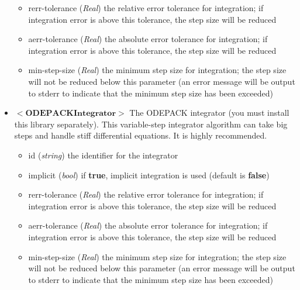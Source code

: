 \documentclass{article}
\begin{document}
\begin{landscape}
\begin{itemize}
\begin{itemize}
\item rerr-tolerance (\emph{Real}) the relative error tolerance for integration; if integration error is above this tolerance, the step size will be reduced
\item aerr-tolerance (\emph{Real}) the absolute error tolerance for integration; if integration error is above this tolerance, the step size will be reduced
\item min-step-size (\emph{Real}) the minimum step size for integration; the step size will not be reduced below this parameter (an error message will be output to stderr to indicate that the minimum step size has been exceeded)
\end{itemize} 
\item $<\textbf{ODEPACKIntegrator}>$ The ODEPACK integrator (you must install this library separately). This variable-step integrator algorithm can take big steps and handle stiff differential equations. It is highly recommended.
\begin{itemize}
\item id  (\emph{string}) the identifier for the integrator
\item implicit (\emph{bool}) if \textbf{true}, implicit integration is used (default is \textbf{false})
\item rerr-tolerance (\emph{Real}) the relative error tolerance for integration; if integration error is above this tolerance, the step size will be reduced
\item aerr-tolerance (\emph{Real}) the absolute error tolerance for integration; if integration error is above this tolerance, the step size will be reduced
\item min-step-size (\emph{Real}) the minimum step size for integration; the step size will not be reduced below this parameter (an error message will be output to stderr to indicate that the minimum step size has been exceeded)
\end{itemize} 
\end{itemize}


\end{landscape}
\end{document}
